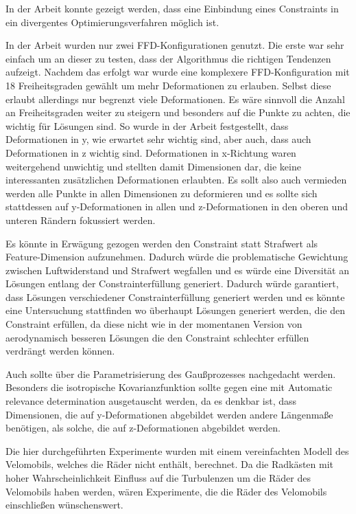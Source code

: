 In der Arbeit konnte gezeigt werden, dass eine Einbindung eines Constraints in ein divergentes Optimierungsverfahren möglich ist.

In der Arbeit wurden nur zwei FFD-Konfigurationen genutzt.
Die erste war sehr einfach um an dieser zu testen, dass der Algorithmus die richtigen Tendenzen aufzeigt.
Nachdem das erfolgt war wurde eine komplexere FFD-Konfiguration mit 18 Freiheitsgraden gewählt um mehr Deformationen zu erlauben.
Selbst diese erlaubt allerdings nur begrenzt viele Deformationen.
Es wäre sinnvoll die Anzahl an Freiheitsgraden weiter zu steigern und besonders auf die Punkte zu achten, die wichtig für Lösungen sind.
So wurde in der Arbeit festgestellt, dass Deformationen in y, wie erwartet sehr wichtig sind, aber auch, dass auch Deformationen in z wichtig sind.
Deformationen in x-Richtung waren weitergehend unwichtig und stellten damit Dimensionen dar, die keine interessanten zusätzlichen Deformationen erlaubten.
Es sollt also auch vermieden werden alle Punkte in allen Dimensionen zu deformieren und es sollte sich stattdessen auf y-Deformationen in allen und z-Deformationen in den oberen und unteren Rändern fokussiert werden.

Es könnte in Erwägung gezogen werden den Constraint statt Strafwert als Feature-Dimension aufzunehmen.
Dadurch würde die problematische Gewichtung zwischen Luftwiderstand und Strafwert wegfallen und es würde eine Diversität an Lösungen entlang der Constrainterfüllung generiert.
Dadurch würde garantiert, dass Lösungen verschiedener Constrainterfüllung generiert werden und es könnte eine Untersuchung stattfinden wo überhaupt Lösungen generiert werden, die den Constraint erfüllen, da diese nicht wie in der momentanen Version von aerodynamisch besseren Lösungen die den Constraint schlechter erfüllen verdrängt werden können.

Auch sollte über die Parametrisierung des Gaußprozesses nachgedacht werden.
Besonders die isotropische Kovarianzfunktion sollte gegen eine mit Automatic relevance determination ausgetauscht werden, da es denkbar ist, dass Dimensionen, die auf y-Deformationen abgebildet werden andere Längenmaße benötigen, als solche, die auf z-Deformationen abgebildet werden.

Die hier durchgeführten Experimente wurden mit einem vereinfachten Modell des Velomobils, welches die Räder nicht enthält, berechnet.
Da die Radkästen mit hoher Wahrscheinlichkeit Einfluss auf die Turbulenzen um die Räder des Velomobils haben werden, wären Experimente, die die Räder des Velomobils einschließen wünschenswert.

